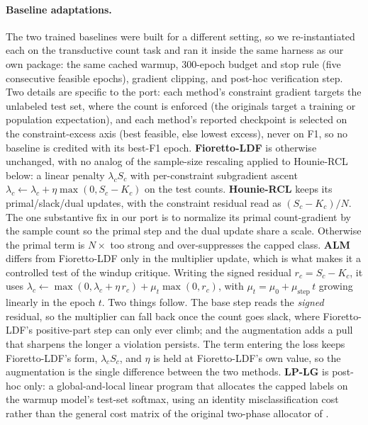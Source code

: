 \documentclass[10pt]{article}
\begin{document}
\paragraph{Baseline adaptations.}
The two trained baselines were built for a different setting, so we
re-instantiated each on the transductive count task and ran it inside the
same harness as our own package: the same cached warmup, $300$-epoch budget
and stop rule (five consecutive feasible epochs), gradient clipping, and
post-hoc verification step. Two details are specific to the port: each
method's constraint gradient targets the unlabeled test set, where the
count is enforced (the originals target a training or population
expectation), and each method's reported checkpoint is selected on the
constraint-excess axis (best feasible, else lowest excess), never on F1, so
no baseline is credited with its best-F1 epoch. \textbf{Fioretto-LDF} is
otherwise unchanged, with no analog of the sample-size rescaling applied to
Hounie-RCL below: a linear penalty $\lambda_c S_c$ with per-constraint
subgradient ascent
$\lambda_c\!\leftarrow\!\lambda_c+\eta\max(0,S_c\!-\!K_c)$ on the test
counts. \textbf{Hounie-RCL} keeps its primal/slack/dual updates, with the
constraint residual read as $(S_c\!-\!K_c)/N$. The one substantive fix in
our port is to normalize its primal count-gradient by the sample count so
the primal step and the dual update share a scale. Otherwise the primal
term is $N\times$ too strong and over-suppresses the capped class.
{\textbf{ALM} differs from Fioretto-LDF only in the multiplier update,
which is what makes it a controlled test of the windup critique. Writing the
signed residual $r_c\!=\!S_c\!-\!K_c$, it uses
$\lambda_c\!\leftarrow\!\max(0,\lambda_c\!+\!\eta\,r_c)+\mu_t\max(0,r_c)$, with
$\mu_t\!=\!\mu_0\!+\!\mu_{\mathrm{step}}\,t$ growing linearly in the epoch $t$.
Two things follow. The base step reads the \emph{signed} residual, so the
multiplier can fall back once the count goes slack, where Fioretto-LDF's
positive-part step can only ever climb; and the augmentation adds a pull that
sharpens the longer a violation persists. The term entering the loss keeps
Fioretto-LDF's form, $\lambda_c S_c$, and $\eta$ is held at Fioretto-LDF's own
value, so the augmentation is the single difference between the two methods.}
\textbf{LP-LG} is post-hoc only: a global-and-local linear program that
allocates the capped labels on the warmup model's test-set softmax, using
an identity misclassification cost rather than the general cost matrix
of the original two-phase allocator of
\citet{shifman2025classification}.
\end{document}
